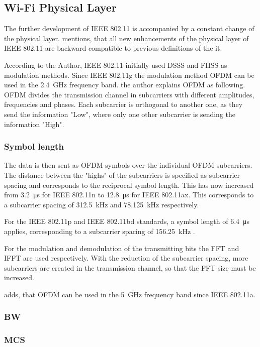 \subsection*{Wi-Fi Physical Layer}
The further development of IEEE 802.11 is accompanied by a constant change of the physical layer. \textcite{sauter_wireless_2022} mentions, that all new enhancements of the physical layer of IEEE 802.11 are backward compatible to previous definitions of the it.

According to the Author, IEEE 802.11 initially used DSSS and FHSS as modulation methods.
Since IEEE 802.11g the modulation method \ac{OFDM} can be used in the \SI{2.4}{\giga\hertz} frequency band. the author explains \ac{OFDM} as following. \ac{OFDM} divides the transmission channel in subcarriers with different amplitudes, frequencies and phases. Each subcarrier is orthogonal to another one, as they send the information "Low", where only one other subcarrier is sending the information "High". 

\subsubsection*{Symbol length}
The data is then sent as \ac{OFDM} symbols over the individual \ac{OFDM} subcarriers. The distance between the "highs" of the subcarriers is specified as subcarrier spacing and corresponds to the reciprocal symbol length. This has now increased from \SI{3.2}{\micro\second} for IEEE 802.11n to \SI{12.8}{\micro\second} for IEEE 802.11ax. This corresponds to a subcarrier spacing of \SI{312.5}{\kilo\hertz} and \SI{78.125}{\kilo\hertz} respectively. 

For the IEEE 802.11p and IEEE 802.11bd standards, a symbol length of \SI{6.4}{\micro\second} applies, corresponding to a subcarrier spacing of \SI{156.25}{\kilo\hertz} \cite{jacob_system-level_2020}.

For the modulation and demodulation of the transmitting bits the FFT and IFFT are used respectively. With the reduction of the subcarrier spacing, more subcarriers are created in the transmission channel, so that the FFT size must be increased. 

\textcite{kauffels_wireless_2002} adds, that \ac{OFDM} can be used in the \SI{5}{\giga\hertz} frequency band since IEEE 802.11a. 
\subsubsection*{\acf{BW}}
\subsubsection*{\acf{MCS}}

